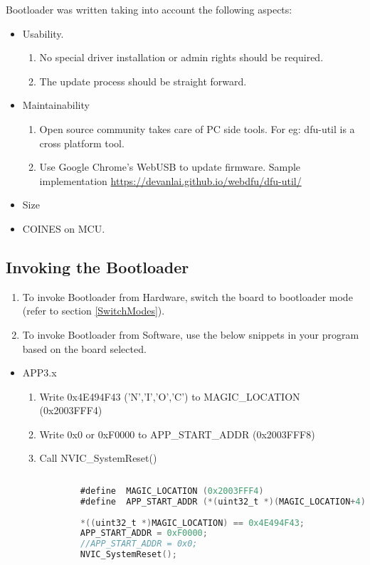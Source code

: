 \documentclass{article}
\begin{document}
Bootloader was written taking into account the following aspects:
\begin{itemize}
	\item Usability.
	\begin{enumerate}[label=\roman*.]
		\item No special driver installation or admin rights should be required.
		\item The update process should be straight forward.
	\end{enumerate}
	\item Maintainability
	\begin{enumerate}[label=\roman*.]
		\item Open source community takes care of PC side tools. For eg: dfu-util is a cross platform tool.
		\item Use Google Chrome's WebUSB to update firmware. Sample implementation \url{https://devanlai.github.io/webdfu/dfu-util/}
	\end{enumerate}
	\item Size
	\item COINES on MCU.
\end{itemize}

\subsection{Invoking the Bootloader}
\begin{enumerate}
	\item To invoke Bootloader from Hardware, switch the board to bootloader mode (refer to section \ref{SwitchModes}).
	\item To invoke Bootloader from Software, use the below snippets in your program based on the board selected.
\end{enumerate}

\begin{itemize}
	\item APP3.x
	\begin{enumerate}[label=\roman*.]
		\item Write 0x4E494F43 ('N','I','O','C') to MAGIC\_LOCATION (0x2003FFF4)
		\item Write 0x0 or 0xF0000 to APP\_START\_ADDR (0x2003FFF8)
		\item Call NVIC\_SystemReset()
		\begin{lstlisting}[language=C]
		
		#define  MAGIC_LOCATION (0x2003FFF4)
		#define  APP_START_ADDR (*(uint32_t *)(MAGIC_LOCATION+4)
		 
		*((uint32_t *)MAGIC_LOCATION) == 0x4E494F43;
		APP_START_ADDR = 0xF0000;
		//APP_START_ADDR = 0x0;
		NVIC_SystemReset();
		
		\end{lstlisting}
	\end{enumerate}
\end{itemize}
\end{document}
